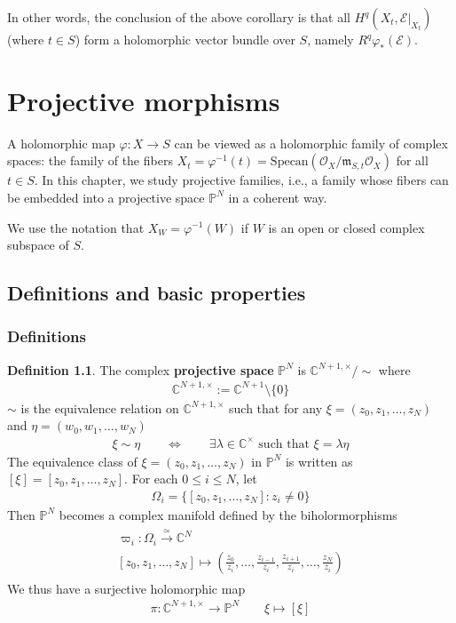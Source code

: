 \documentclass[12pt,b5paper,notitlepage]{report}
\theoremstyle{definition}
\newtheorem{df}{Definition}[section]
\theoremstyle{plain}
\newcommand{\scr}{\mathscr}
\newcommand{\Cbb}{\mathbb C}
\newcommand{\Pbb}{\mathbb P}
\newcommand{\Specan}{\mathrm{Specan}}
\newcommand{\mk}{\mathfrak m}
\numberwithin{equation}{section}
\begin{document}
In other words, the conclusion of the above corollary is that all $H^q(X_t,\scr E|_{X_t})$ (where $t\in S$) form a holomorphic vector bundle over $S$, namely $R^q\varphi_*(\scr E)$.




\chapter{Projective morphisms}



A holomorphic map $\varphi:X\rightarrow S$ can be viewed as a holomorphic family of complex spaces: the family of the fibers $X_t=\varphi^{-1}(t)=\Specan(\scr O_X/\mk_{S,t}\scr O_X)$ for all $t\in S$. In this chapter, we study projective families, i.e., a family whose fibers can be embedded into a projective space $\Pbb^N$ in a coherent way.


We use the notation that $X_W=\varphi^{-1}(W)$ if $W$ is an open or closed complex subspace of $S$.


\section{Definitions and basic properties}


\subsection{Definitions}




\begin{df}
The complex \textbf{projective space} $\Pbb^N$ is $\Cbb^{N+1,\times}/\sim$ where \index{CN@$\Cbb^{N+1,\times}:=\Cbb^{N+1}\setminus\{0\}$}
\begin{align}
\Cbb^{N+1,\times}:=\Cbb^{N+1}\setminus\{0\}
\end{align}
$\sim$ is the equivalence relation on $\Cbb^{N+1,\times}$ such that for any $\xi=(z_0,z_1,\dots,z_N)$ and $\eta=(w_0,w_1,\dots,w_N)$
\begin{gather*}
\xi\sim \eta\qquad\Longleftrightarrow\qquad \exists \lambda\in\Cbb^\times\text{ such that }\xi=\lambda\eta
\end{gather*}
The equivalence class of $\xi=(z_0,z_1,\dots,z_N)$ in $\Pbb^N$ is written as $[\xi]=[z_0,z_1,\dots,z_N]$. For each $0\leq i\leq N$, let
\begin{align}
\Omega_i=\{[z_0,z_1,\dots,z_N]:z_i\neq 0 \}
\end{align}
Then $\Pbb^N$ becomes a complex manifold defined by the biholormorphisms
\begin{gather}
\begin{gathered}
\varpi_i:\Omega_i\xrightarrow{\simeq}\Cbb^N\\
[z_0,z_1,\dots,z_N]\mapsto \left(\frac {z_0}{z_i},\dots,\frac{z_{i-1}}{z_i},\frac{z_{i+1}}{z_i},\dots,\frac{z_N}{z_i} \right)
\end{gathered}
\end{gather}
We thus have a surjective holomorphic map
\begin{align}
\pi:\Cbb^{N+1,\times}\rightarrow\Pbb^N\qquad \xi\mapsto[\xi]
\end{align}
\end{df}
\end{document}
